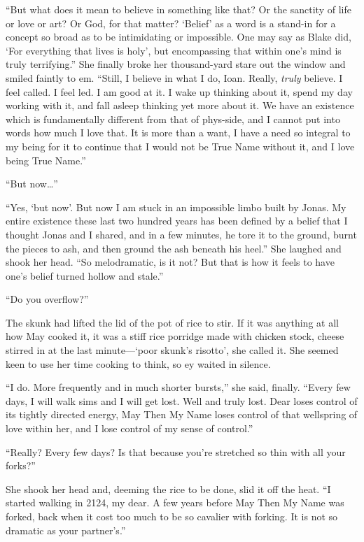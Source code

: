 ``But what does it mean to believe in something like that? Or the sanctity of life or love or art? Or God, for that matter? `Belief' as a word is a stand-in for a concept so broad as to be intimidating or impossible. One may say as Blake did, `For everything that lives is holy', but encompassing that within one's mind is truly terrifying.'' She finally broke her thousand-yard stare out the window and smiled faintly to em. ``Still, I believe in what I do, Ioan. Really, \emph{truly} believe. I feel called. I feel led. I am good at it. I wake up thinking about it, spend my day working with it, and fall asleep thinking yet more about it. We have an existence which is fundamentally different from that of phys-side, and I cannot put into words how much I love that. It is more than a want, I have a need so integral to my being for it to continue that I would not be True Name without it, and I love being True Name.''

``But now\ldots{}''

``Yes, `but now'. But now I am stuck in an impossible limbo built by Jonas. My entire existence these last two hundred years has been defined by a belief that I thought Jonas and I shared, and in a few minutes, he tore it to the ground, burnt the pieces to ash, and then ground the ash beneath his heel.'' She laughed and shook her head. ``So melodramatic, is it not? But that is how it feels to have one's belief turned hollow and stale.''

``Do you overflow?''

The skunk had lifted the lid of the pot of rice to stir. If it was anything at all how May cooked it, it was a stiff rice porridge made with chicken stock, cheese stirred in at the last minute—`poor skunk's risotto', she called it. She seemed keen to use her time cooking to think, so ey waited in silence.

``I do. More frequently and in much shorter bursts,'' she said, finally. ``Every few days, I will walk sims and I will get lost. Well and truly lost. Dear loses control of its tightly directed energy, May Then My Name loses control of that wellspring of love within her, and I lose control of my sense of control.''

``Really? Every few days? Is that because you're stretched so thin with all your forks?''

She shook her head and, deeming the rice to be done, slid it off the heat. ``I started walking in 2124, my dear. A few years before May Then My Name was forked, back when it cost too much to be so cavalier with forking. It is not so dramatic as your partner's.''

